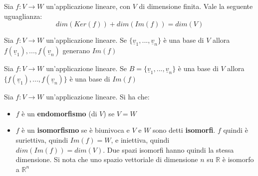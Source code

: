 \documentclass[a4paper,12pt, oneside]{book}
\begin{document}
\begin{teorema}
	Sia $f:V\rightarrow W$ un'applicazione lineare, con $V$ di dimensione finita. Vale la seguente uguaglianza:
	$$dim(Ker(f))+dim(Im(f))=dim(V)$$
\end{teorema}
\begin{teorema}
	Sia $f:V\rightarrow W$ un'applicazione lineare. Se $\{\underline{v}_1,...,\underline{v}_n\}$ è una base di $V$ allora $f(\underline{v}_1),..., f(\underline{v}_n)$ generano $Im(f)$
\end{teorema}
\begin{teorema}
	Sia $f:V\rightarrow W$ un'applicazione lineare. Se $B=\{\underline{v}_1,...,\underline{v}_n\}$ è una base di $V$ allora $\{f(\underline{v}_1),..., f(\underline{v}_n)\}$ è una base di $Im(f)$
\end{teorema}
\begin{definizione}
	Sia $f:V\rightarrow W$ un'applicazione lineare. Si ha che:
	\begin{itemize}
		\item $f$ è un \textbf{endomorfismo} (di $V$) se $V=W$
		\item $f$ è un \textbf{isomorfismo} se è biunivoca e $V$ e $W$ sono detti \textbf{isomorfi}. $f$ quindi è suriettiva, quindi $Im(f)=W$, e iniettiva, quindi $dim(Im(f))=dim(V)$. Due spazi isomorfi hanno quindi la stessa dimensione. Si nota che uno spazio vettoriale di dimensione $n$ su $\mathbb{R}$ è isomorfo a $\mathbb{R}^n$
	\end{itemize}
\end{definizione}
\end{document}
